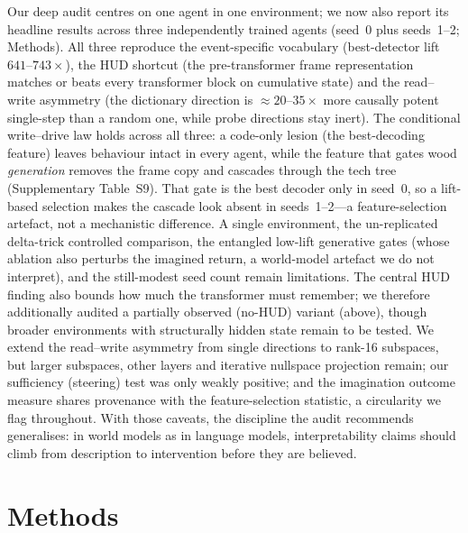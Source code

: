 \documentclass[pdflatex,sn-mathphys-num]{sn-jnl}%
\theoremstyle{thmstyleone}%
\theoremstyle{thmstyletwo}%
\theoremstyle{thmstylethree}%
\begin{document}
Our deep audit centres on one agent in one environment; we now also report its headline results across three independently trained agents (seed~0 plus seeds~1--2; Methods). All three reproduce the event-specific vocabulary (best-detector lift $641$--$743\times$), the HUD shortcut (the pre-transformer frame representation matches or beats every transformer block on cumulative state) and the read--write asymmetry (the dictionary direction is $\approx\!20$--$35\times$ more causally potent single-step than a random one, while probe directions stay inert). The conditional write--drive law holds across all three: a code-only lesion (the best-decoding feature) leaves behaviour intact in every agent, while the feature that gates wood \emph{generation} removes the frame copy and cascades through the tech tree (Supplementary Table~S9). That gate is the best decoder only in seed~0, so a lift-based selection makes the cascade look absent in seeds~1--2---a feature-selection artefact, not a mechanistic difference. A single environment, the un-replicated delta-trick controlled comparison, the entangled low-lift generative gates (whose ablation also perturbs the imagined return, a world-model artefact we do not interpret), and the still-modest seed count remain limitations. The central HUD finding also bounds how much the transformer must remember; we therefore additionally audited a partially observed (no-HUD) variant (above), though broader environments with structurally hidden state remain to be tested. We extend the read--write asymmetry from single directions to rank-16 subspaces, but larger subspaces, other layers and iterative nullspace projection remain; our sufficiency (steering) test was only weakly positive; and the imagination outcome measure shares provenance with the feature-selection statistic, a circularity we flag throughout. With those caveats, the discipline the audit recommends generalises: in world models as in language models, interpretability claims should climb from description to intervention before they are believed.

\section{Methods}\label{sec:methods}
\end{document}
